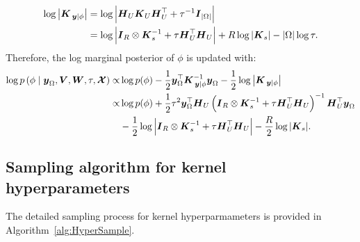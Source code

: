 \documentclass[12pt]{article}
\newcommand{\given}{\;\middle|\;}
\begin{document}
\begin{equation} \notag
\begin{aligned}
\log{\left|\boldsymbol{K}_{\left.\boldsymbol{y}\right|\phi}\right|}&=\log{\left|\boldsymbol{H}_{U}\boldsymbol{K}_{U}\boldsymbol{H}_{U}^{\top}+\tau^{-1}\boldsymbol{I}_{|\Omega|}\right|} \\
&=\log{\left|\boldsymbol{I}_{R}\otimes\boldsymbol{K}_{s}^{-1}+\tau\boldsymbol{H}_{U}^{\top}\boldsymbol{H}_{U}\right|}+R\log{\left|\boldsymbol{K}_{s}\right|}-|\Omega|\log{\tau}.
\end{aligned}
\end{equation}
Therefore, the log marginal posterior of $\phi$ is updated with:
\begin{equation} \notag
\begin{aligned}
\log{p\left(\phi\given\boldsymbol{y}_{\Omega},\boldsymbol{V},\boldsymbol{W},\tau,\boldsymbol{\mathcal{X}}\right)}\propto&\log{p(\phi)}-\frac{1}{2}\boldsymbol{y}_{\Omega}^{\top}\boldsymbol{K}_{\left.\boldsymbol{y}\right|\phi}^{-1}\boldsymbol{y}_{\Omega}-\frac{1}{2}\log{\left|\boldsymbol{K}_{\left.\boldsymbol{y}\right|\phi}\right|} \\
\propto&\log{p(\phi)}+\frac{1}{2}\tau^2\boldsymbol{y}_{\Omega}^{\top}\boldsymbol{H}_{U}\left(\boldsymbol{I}_{R}\otimes\boldsymbol{K}_{s}^{-1}+\tau\boldsymbol{H}_{U}^{\top}\boldsymbol{H}_{U}\right)^{-1}\boldsymbol{H}_{U}^{\top}\boldsymbol{y}_{\Omega} \\
&-\frac{1}{2}\log{\left|\boldsymbol{I}_{R}\otimes\boldsymbol{K}_{s}^{-1}+\tau\boldsymbol{H}_{U}^{\top}\boldsymbol{H}_{U}\right|}-\frac{R}{2}\log{\left|\boldsymbol{K}_{s}\right|}.
\end{aligned}
\end{equation}



\subsection{Sampling algorithm for kernel hyperparameters}\label{appB}


The detailed sampling process for kernel hyperparmameters is provided in Algorithm~\ref{alg:HyperSample}.
\end{document}
